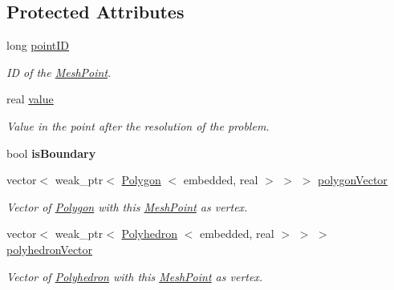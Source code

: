 \subsection*{\-Protected \-Attributes}
\begin{DoxyCompactItemize}
\item 
\hypertarget{class_mesh_point_a474d09b4818c37c554f2d89a86da4d10}{long \hyperlink{class_mesh_point_a474d09b4818c37c554f2d89a86da4d10}{point\-I\-D}}\label{class_mesh_point_a474d09b4818c37c554f2d89a86da4d10}

\begin{DoxyCompactList}\small\item\em \-I\-D of the \hyperlink{class_mesh_point}{\-Mesh\-Point}. \end{DoxyCompactList}\item 
\hypertarget{class_mesh_point_a6b519968ffd55e29a8486e30d46a9517}{real \hyperlink{class_mesh_point_a6b519968ffd55e29a8486e30d46a9517}{value}}\label{class_mesh_point_a6b519968ffd55e29a8486e30d46a9517}

\begin{DoxyCompactList}\small\item\em \-Value in the point after the resolution of the problem. \end{DoxyCompactList}\item 
\hypertarget{class_mesh_point_ab42a8a9014ed3fe6e3623dd2ef305c8d}{bool {\bfseries is\-Boundary}}\label{class_mesh_point_ab42a8a9014ed3fe6e3623dd2ef305c8d}

\item 
vector$<$ weak\-\_\-ptr$<$ \hyperlink{class_polygon}{\-Polygon}\*
$<$ embedded, real $>$ $>$ $>$ \hyperlink{class_mesh_point_a114d5fed31c8ca38751e66ebf9a6648a}{polygon\-Vector}
\begin{DoxyCompactList}\small\item\em \-Vector of \hyperlink{class_polygon}{\-Polygon} with this \hyperlink{class_mesh_point}{\-Mesh\-Point} as vertex. \end{DoxyCompactList}\item 
vector$<$ weak\-\_\-ptr$<$ \hyperlink{class_polyhedron}{\-Polyhedron}\*
$<$ embedded, real $>$ $>$ $>$ \hyperlink{class_mesh_point_a675c54208346d021ad9a90e382f9c1d3}{polyhedron\-Vector}
\begin{DoxyCompactList}\small\item\em \-Vector of \hyperlink{class_polyhedron}{\-Polyhedron} with this \hyperlink{class_mesh_point}{\-Mesh\-Point} as vertex. \end{DoxyCompactList}\end{DoxyCompactItemize}


